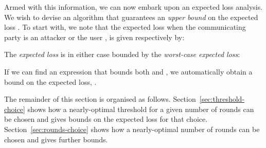 \documentclass[a4paper]{article}
\theoremstyle{plain} \newtheorem{remark}{Remark}
\theoremstyle{plain} \newtheorem{definition}{Definition}
\theoremstyle{plain} \newtheorem{example}{Example}
\theoremstyle{plain} \newtheorem{assumption}{Assumption}
\theoremstyle{plain} \newtheorem{conjecture}{Conjecture}
\theoremstyle{plain} \newtheorem{theorem}{Theorem}
\theoremstyle{plain} \newtheorem{proposition}{Proposition}
\theoremstyle{plain} \newtheorem{lemma}{Lemma}
\theoremstyle{plain} \newtheorem{corollary}{Corollary}
\begin{document}
Armed with this information, we can now embark upon an
expected loss analysis.  We wish to devise an algorithm that
guarantees an {\em upper bound} on the expected loss . To
start with, we note that the expected loss when the
communicating party is an attacker  or the user , is given
respectively by:

The \textit{expected loss} is in either case bounded by the {\em worst-case expected loss}:

If we can find an expression that bounds both  and
, we automatically obtain a bound on the expected
loss, .

The remainder of this section is organised as
follows. Section~\ref{sec:threshold-choice} shows how a nearly-optimal
threshold  for a given number of rounds  can be chosen and
gives bounds on the expected loss for that choice.
Section~\ref{sec:rounds-choice} shows how a nearly-optimal number of
rounds  can be chosen and gives further bounds.
\end{document}
